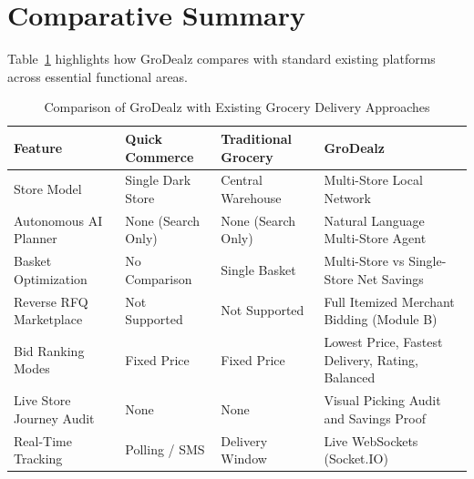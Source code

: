 \section{Comparative Summary}

Table~\ref{tab:lit_comparison} highlights how GroDealz compares with standard existing platforms across essential functional areas.

\begin{table}[H]
\centering
\caption{Comparison of GroDealz with Existing Grocery Delivery Approaches}
\label{tab:lit_comparison}
\begin{tabular}{>{\raggedright\arraybackslash}p{3.2cm} >{\raggedright\arraybackslash}p{2.8cm} >{\raggedright\arraybackslash}p{3.2cm} >{\raggedright\arraybackslash}p{4.2cm}}
\toprule
\textbf{Feature} & \textbf{Quick Commerce} & \textbf{Traditional Grocery} & \textbf{GroDealz} \\
\midrule
Store Model & Single Dark Store & Central Warehouse & Multi-Store Local Network \\
\addlinespace
Autonomous AI Planner & None (Search Only) & None (Search Only) & Natural Language Multi-Store Agent \\
\addlinespace
Basket Optimization & No Comparison & Single Basket & Multi-Store vs Single-Store Net Savings \\
\addlinespace
Reverse RFQ Marketplace & Not Supported & Not Supported & Full Itemized Merchant Bidding (Module B) \\
\addlinespace
Bid Ranking Modes & Fixed Price & Fixed Price & Lowest Price, Fastest Delivery, Rating, Balanced \\
\addlinespace
Live Store Journey Audit & None & None & Visual Picking Audit and Savings Proof \\
\addlinespace
Real-Time Tracking & Polling / SMS & Delivery Window & Live WebSockets (Socket.IO) \\
\bottomrule
\end{tabular}
\end{table}
